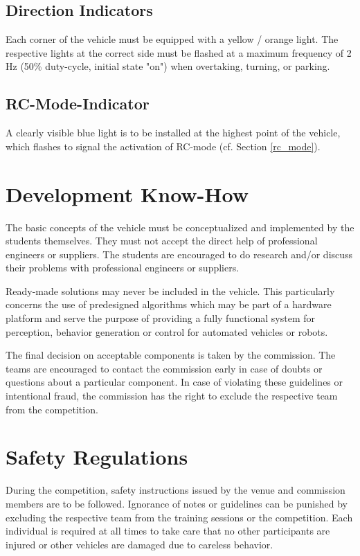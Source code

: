 \documentclass[a4paper]{report}
\begin{document}
\subsection{Direction Indicators}

Each corner of the vehicle must be equipped with a yellow / orange light. The respective lights at the correct side must be flashed at a maximum frequency of 2 Hz (50\% duty-cycle, initial state "on") when overtaking, turning, or parking. 

\subsection{RC-Mode-Indicator}

A clearly visible blue light is to be installed at the highest point of the vehicle, which flashes to signal the activation of RC-mode (cf. Section \ref{rc_mode}). 

\section{Development Know-How} 
\label{dev_know_how}

The basic concepts of the vehicle must be conceptualized and implemented by the students themselves. They must not accept the direct help of professional engineers or suppliers. The students are encouraged to do research and/or discuss their problems with professional engineers or suppliers. 

Ready-made solutions may never be included in the vehicle. This particularly concerns the use of predesigned algorithms which may be part of a hardware platform and serve the purpose of providing a fully functional system for perception, behavior generation or control for automated vehicles or robots. 

The final decision on acceptable components is taken by the commission. The teams are encouraged to contact the commission early in case of doubts or questions about a particular component. In case of violating these guidelines or intentional fraud, the commission has the right to exclude the respective team from the competition. 

\section{Safety Regulations}

During the competition, safety instructions issued by the venue and commission members are to be followed. Ignorance of notes or guidelines can be punished by excluding the respective team from the training sessions or the competition. Each individual is required at all times to take care that no other participants are injured or other vehicles are damaged due to careless behavior. 
\end{document}
